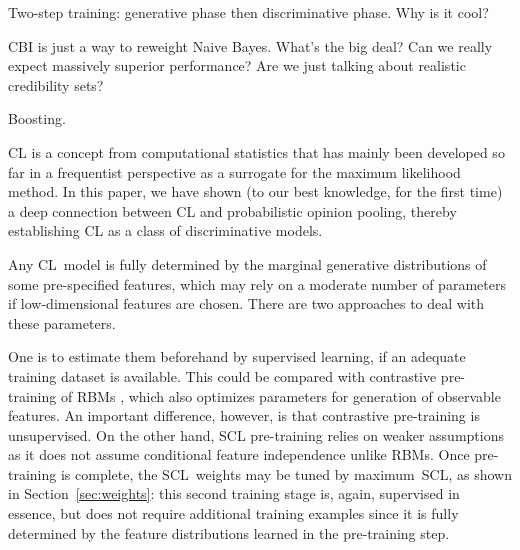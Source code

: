 \documentclass[english]{scrartcl}
\begin{document}
{\color{red}Two-step training: generative phase then discriminative phase. Why is it cool?}

{\color{red}CBI is just a way to reweight Naive Bayes. What's the big deal? Can we really expect massively superior performance? Are we just talking about realistic credibility sets?}

{\color{red}Boosting.}

CL is a concept from computational statistics that has mainly been developed so far in a frequentist perspective as a surrogate for the maximum likelihood method. In this paper, we have shown (to our best knowledge, for the first time) a deep connection between CL and  probabilistic opinion pooling, thereby establishing CL as a class of discriminative models. 

Any CL~model is fully determined by the marginal generative distributions of some pre-specified features, which may rely on a moderate number of parameters if low-dimensional features are chosen. There are two approaches to deal with these parameters.

One is to estimate them beforehand by supervised learning, if an adequate training dataset is available. This could be compared with contrastive pre-training of RBMs \cite{Hinton-06,Fischer-14}, which also optimizes parameters for generation of observable features. An important difference, however, is that contrastive pre-training is unsupervised. On the other hand, SCL pre-training relies on weaker assumptions as it does not assume conditional feature independence unlike RBMs. Once pre-training is complete, the SCL~weights may be tuned by maximum~SCL, as shown in Section~\ref{sec:weights}: this second training stage is, again, supervised in essence, but does not require additional training examples since it is fully determined by the feature distributions learned in the pre-training step.


\end{document}

